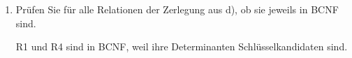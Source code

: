 \documentclass{lehramt-informatik-aufgabe}
\begin{document}
\begin{enumerate}
\begin{liAntwort}
\begin{itemize}
\r[R1]{\u{A, D}, E}\\
\r[R2]{\u{B, C}, A, E}\\
\r[R3]{\u{D}, B}\\
\r[R4]{\u{D, E}, C}\\
\r[R5]{\u{A}, F}

\item {}

\liNichtsZuTun

\item {}
\liNichtsZuTun

\end{itemize}
\end{liAntwort}


\item Prüfen Sie für alle Relationen der Zerlegung aus d), ob sie
jeweils in BCNF sind.

\begin{liAntwort}
R1 und R4 sind in BCNF, weil ihre Determinanten Schlüsselkandidaten
sind.
\end{liAntwort}

\end{enumerate}
\end{document}
